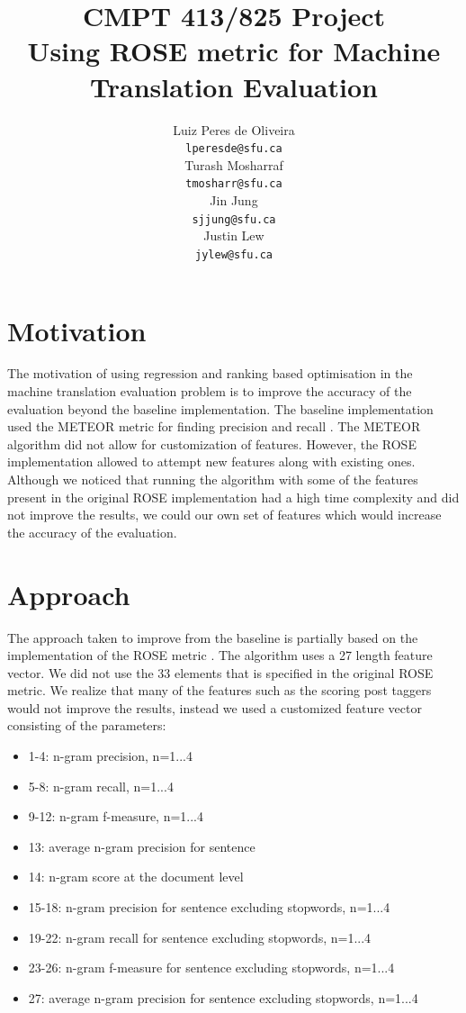 \documentclass[11pt,letterpaper]{article}
\title{CMPT 413/825 Project\\Using ROSE metric for Machine Translation Evaluation}
\author{Luiz Peres de Oliveira \\
  {\tt lperesde@sfu.ca} \\\And
  Turash Mosharraf \\
  {\tt tmosharr@sfu.ca} \\\And
  Jin Jung \\
  {\tt sjjung@sfu.ca} \\\And
  Justin Lew \\
  {\tt jylew@sfu.ca}
  }
\date{}
\begin{document}
\maketitle

\section{Motivation}

The motivation of using regression and ranking based optimisation in the machine translation evaluation problem is to improve the accuracy of the evaluation beyond the baseline implementation. The baseline implementation used the METEOR metric for finding precision and recall \cite{lavie2007meteor}. The METEOR algorithm did not allow for customization of features. However, the ROSE implementation allowed to attempt new features along with existing ones. Although we noticed that running the algorithm with some of the features present in the original ROSE implementation had a high time complexity and did not improve the results, we could our own set of features which would increase the accuracy of the evaluation.

\section{Approach}

The approach taken to improve from the baseline is partially based on the implementation of the ROSE metric \cite{song2011regression}. The algorithm uses a 27 length feature vector. We did not use the 33 elements that is specified in the original ROSE metric. We realize that many of the features such as the scoring post taggers would not improve the results, instead we used a customized feature vector consisting of the parameters:
	\begin{itemize}
		\item 1-4: n-gram precision, n=1...4
		\item 5-8: n-gram recall, n=1...4
		\item 9-12: n-gram f-measure, n=1...4
		\item 13: average n-gram precision for sentence
		\item 14: n-gram score at the document level
		\item 15-18: n-gram precision for sentence excluding stopwords, n=1...4
		\item19-22: n-gram recall for sentence excluding stopwords, n=1...4
		\item 23-26: n-gram f-measure for sentence excluding stopwords, n=1...4
		\item 27: average n-gram precision for sentence excluding stopwords, n=1...4
	\end{itemize}
\end{document}
